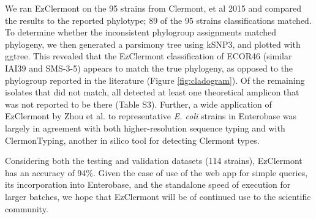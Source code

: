 We ran EzClermont on the 95 strains from Clermont, et al 2015 and compared the results to the reported phylotype; 89 of the 95 strains classifications matched.  To determine whether the inconsistent phylogroup assignments matched phylogeny, we then generated a parsimony tree using kSNP3\cite{Gardner2015a}, and plotted with ggtree\cite{Yu2017a}. This revealed that the EzClermont classification of ECOR46 (similar IAI39 and SMS-3-5) appears to match the true phylogeny, as opposed to the phylogroup reported in the literature (Figure \ref{fig:cladogram}).  Of the remaining isolates that did not match, all detected at least one theoretical amplicon that was not reported to be there (Table S3). Further, a wide application of EzClermont by Zhou et al.\cite{zhou_users_2019} to representative \textit{E. coli}  strains in Enterobase was largely in agreement with both higher-resolution sequence typing and with ClermonTyping\cite{beghain_clermontyping:_2018}, another in silico tool for detecting Clermont types.





Considering both the testing and validation datasets (114 strains), EzClermont has an accuracy of 94\%. Given the ease of use of the web app for simple queries, its incorporation into Enterobase, and the standalone speed of execution for larger batches, we hope that EzClermont will be of continued use to the scientific community.
